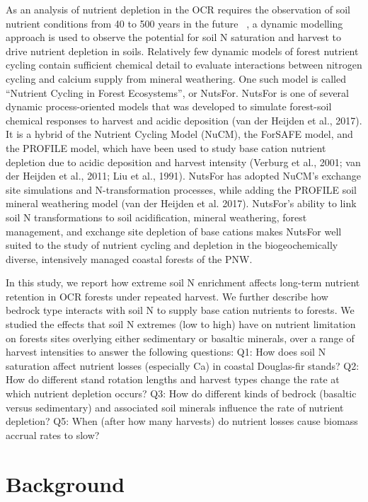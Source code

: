 \documentclass[double,12pt]{beavtex}
\begin{document}
As an analysis of nutrient depletion in the OCR requires the observation of soil nutrient conditions from 40 to 500 years in the future ~\citep{perakisCoupledNitrogenCalcium2006}, a dynamic modelling approach is used to  observe the potential for soil N saturation and harvest to drive nutrient depletion in soils. Relatively few dynamic models of forest nutrient cycling contain sufficient chemical detail to evaluate interactions between nitrogen cycling and calcium supply from mineral weathering. One such model is called “Nutrient Cycling in Forest Ecosystems”, or NutsFor. NutsFor is one of several dynamic process-oriented models that was developed to simulate forest-soil chemical responses to harvest and acidic deposition (van der Heijden et al., 2017). It is a hybrid of the Nutrient Cycling Model (NuCM), the ForSAFE model, and the PROFILE model, which have been used to study base cation nutrient depletion due to acidic deposition and harvest intensity (Verburg et al., 2001; van der Heijden et al., 2011; Liu et al., 1991). NutsFor has adopted NuCM’s exchange site simulations and N-transformation processes, while adding the PROFILE soil mineral weathering model (van der Heijden et al. 2017). NutsFor’s ability to link soil N transformations to soil acidification, mineral weathering, forest management, and exchange site depletion of base cations makes NutsFor well suited to the study of nutrient cycling and depletion in the biogeochemically diverse, intensively managed coastal forests of the PNW. 

In this study, we report how extreme soil N enrichment affects long-term nutrient retention in OCR forests under repeated harvest. We further describe how bedrock type interacts with soil N to supply base cation nutrients to forests. We studied the effects that soil N extremes (low to high) have on nutrient limitation on forests sites overlying either sedimentary or basaltic minerals, over a range of harvest intensities to answer the following questions: Q1: How does soil N saturation affect nutrient losses (especially Ca) in coastal Douglas-fir stands? Q2: How do different stand rotation lengths and harvest types change the rate at which nutrient depletion occurs? Q3: How do different kinds of bedrock (basaltic versus sedimentary) and associated soil minerals influence the rate of nutrient depletion? Q5: When (after how many harvests) do nutrient losses cause biomass accrual rates to slow?



\section{Background}
\end{document}
